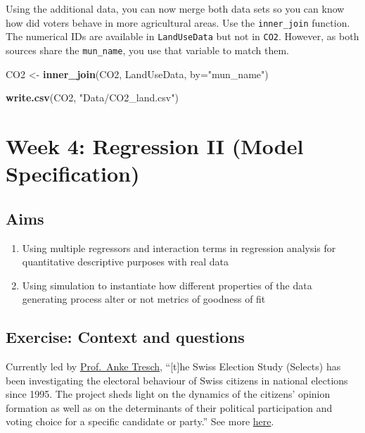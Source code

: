 \documentclass[
]{book}
\newenvironment{Shaded}{\begin{snugshade}}{\end{snugshade}}
\newcommand{\AttributeTok}[1]{\textcolor[rgb]{0.13,0.29,0.53}{#1}}
\newcommand{\FunctionTok}[1]{\textcolor[rgb]{0.13,0.29,0.53}{\textbf{#1}}}
\newcommand{\NormalTok}[1]{#1}
\newcommand{\OtherTok}[1]{\textcolor[rgb]{0.56,0.35,0.01}{#1}}
\newcommand{\StringTok}[1]{\textcolor[rgb]{0.31,0.60,0.02}{#1}}
\providecommand{\tightlist}{%
  \setlength{\itemsep}{0pt}\setlength{\parskip}{0pt}}
\begin{document}
Using the additional data, you can now merge both data sets so you can know how did voters behave in more agricultural areas. Use the \texttt{inner\_join} function. The numerical IDs are available in \texttt{LandUseData} but not in \texttt{CO2}. However, as both sources share the \texttt{mun\_name}, you use that variable to match them.

\begin{Shaded}
\begin{Highlighting}[]
\NormalTok{CO2 }\OtherTok{\textless{}{-}} \FunctionTok{inner\_join}\NormalTok{(CO2, LandUseData, }\AttributeTok{by=}\StringTok{"mun\_name"}\NormalTok{)  }

\FunctionTok{write.csv}\NormalTok{(CO2, }\StringTok{"Data/CO2\_land.csv"}\NormalTok{)}
\end{Highlighting}
\end{Shaded}

\hypertarget{week-4-regression-ii-model-specification}{%
\chapter{Week 4: Regression II (Model Specification)}\label{week-4-regression-ii-model-specification}}

\hypertarget{aims-2}{%
\section{Aims}\label{aims-2}}

\begin{enumerate}
\def\labelenumi{\arabic{enumi}.}
\tightlist
\item
  Using multiple regressors and interaction terms in regression analysis for quantitative descriptive purposes with real data
\item
  Using simulation to instantiate how different properties of the data generating process alter or not metrics of goodness of fit
\end{enumerate}

\hypertarget{exercise-context-and-questions}{%
\section{Exercise: Context and questions}\label{exercise-context-and-questions}}

Currently led by \href{https://forscenter.ch/staff/anke-tresch/}{Prof.~Anke Tresch}, ``{[}t{]}he Swiss Election Study (Selects) has been investigating the electoral behaviour of Swiss citizens in national elections since 1995. The project sheds light on the dynamics of the citizens' opinion formation as well as on the determinants of their political participation and voting choice for a specific candidate or party.'' See more \href{https://forscenter.ch/projects/selects/}{here}.
\end{document}

